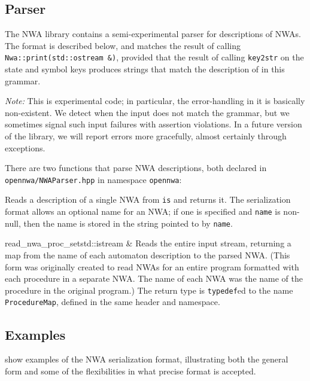 \subsection{Parser}
\label{Se:parser}

The NWA library contains a semi-experimental parser for descriptions of
NWAs. The format is described below, and matches the result of calling
\texttt{Nwa::print(std::ostream \&)}, provided that the result of
calling \texttt{key2str} on the state and symbol keys produces strings
that match the description of  in this grammar.

\emph{Note:} This is experimental code; in particular, the
error-handling in it is basically non-existent. We detect when the
input does not match the grammar, but we sometimes signal such input failures
with assertion violations. In a future version of the library, we will
report errors more gracefully, almost certainly through exceptions.

There are two functions that parse NWA descriptions, both declared in
\texttt{opennwa/NWAParser.hpp} in namespace \texttt{opennwa}:
\begin{functionlist}
  Reads a description of a single NWA from \texttt{is} and
  returns it. The serialization format allows an optional name for an NWA; if
  one is specified and \texttt{name} is non-null, then the name is stored in
  the string pointed to by \texttt{name}.

                   {read\_nwa\_proc\_set}{std::istream \&}{}
  Reads the entire input stream,
  returning a map from the name of each automaton description to the parsed
  NWA. (This form was originally created to read NWAs for an entire program
  formatted with each procedure in a separate NWA. The name of each NWA was
  the name of the procedure in the original program.) The return type
  is \texttt{typedef}ed to the name \texttt{ProcedureMap},
  defined in the same header and namespace.
\end{functionlist}


\subsection{Examples}

 show examples of the NWA serialization format, illustrating
both the general form and some of the flexibilities in what precise
format is accepted.


